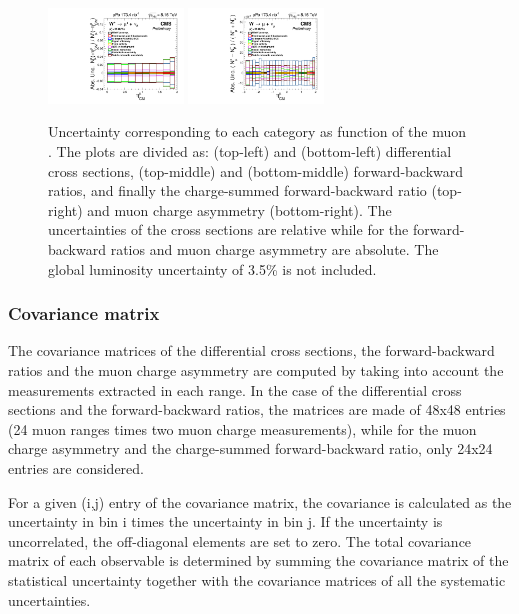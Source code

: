 \begin{figure}[htb!]
 \includegraphics[width=0.32\textwidth]{Figures/WBoson/Analysis/Systematics/gr_WToMuPl_PA_ForwardBackward_Ratio_EffTnP.pdf}
 \includegraphics[width=0.32\textwidth]{Figures/WBoson/Analysis/Systematics/gr_WToMuInc_PA_Charge_Asymmetry_EffTnP.pdf}
 \caption{Uncertainty corresponding to each category as function of the muon \etaCM. The plots are divided as: \WToMuNuMi (top-left) and \WToMuNuPl (bottom-left) differential cross sections, \WToMuNuMi (top-middle) and \WToMuNuPl (bottom-middle) forward-backward ratios, and finally the charge-summed forward-backward ratio (top-right) and muon charge asymmetry (bottom-right). The uncertainties of the cross sections are relative while for the forward-backward ratios and muon charge asymmetry are absolute. The global luminosity uncertainty of 3.5\% is not included.}
 \label{fig:Summary_Systematics}
\end{figure}


\subsubsection{Covariance matrix}\label{sec:WBoson_Analysis_Systematics_CovarianceMatrix}

The covariance matrices of the \WToMuNu differential cross sections, the forward-backward ratios and the muon charge asymmetry are computed by taking into account the measurements extracted in each \etaMuCM range. In the case of the \WToMuNupm differential cross sections and the \WToMuNupm forward-backward ratios, the matrices are made of 48x48 entries (24 muon \etaMuCM ranges times two muon charge measurements), while for the muon charge asymmetry and the charge-summed forward-backward ratio, only 24x24 entries are considered.

For a given (i,j) entry of the covariance matrix, the covariance is calculated as the uncertainty in bin i times the uncertainty in bin j. If the uncertainty is uncorrelated, the off-diagonal elements are set to zero. The total covariance matrix of each observable is determined by summing the covariance matrix of the statistical uncertainty together with the covariance matrices of all the systematic uncertainties.

